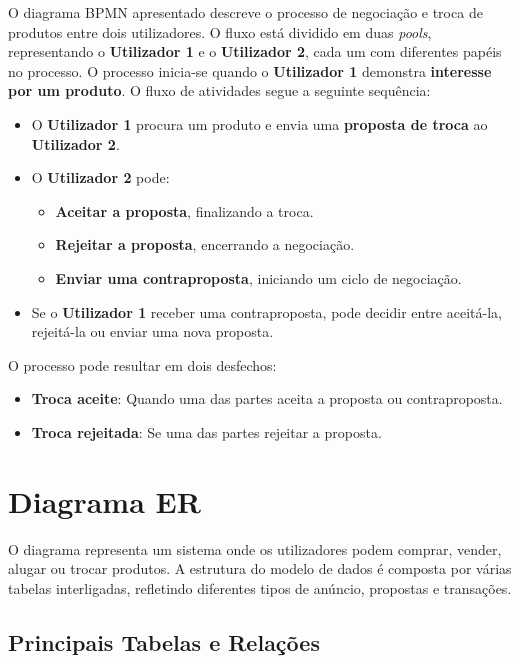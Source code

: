 \documentclass[a4paper, 12pt]{article} %
\begin{document}
O diagrama BPMN apresentado descreve o processo de negociação e troca de produtos entre dois utilizadores. O fluxo está dividido em duas \textit{pools}, representando o \textbf{Utilizador 1} e o \textbf{Utilizador 2}, cada um com diferentes papéis no processo. O processo inicia-se quando o \textbf{Utilizador 1} demonstra \textbf{interesse por um produto}. O fluxo de atividades segue a seguinte sequência:

\begin{itemize}
	\item O \textbf{Utilizador 1} procura um produto e envia uma \textbf{proposta de troca} ao \textbf{Utilizador 2}.
	\item O \textbf{Utilizador 2} pode:
	\begin{itemize}
		\item \textbf{Aceitar a proposta}, finalizando a troca.
		\item \textbf{Rejeitar a proposta}, encerrando a negociação.
		\item \textbf{Enviar uma contraproposta}, iniciando um ciclo de negociação.
	\end{itemize}
	\item Se o \textbf{Utilizador 1} receber uma contraproposta, pode decidir entre aceitá-la, rejeitá-la ou enviar uma nova proposta.
\end{itemize}

O processo pode resultar em dois desfechos:
\begin{itemize}
	\item \textbf{Troca aceite}: Quando uma das partes aceita a proposta ou contraproposta.
	\item \textbf{Troca rejeitada}: Se uma das partes rejeitar a proposta.
\end{itemize}
\newpage
\section{Diagrama ER}

O diagrama representa um sistema onde os utilizadores podem comprar, vender, alugar ou trocar produtos. A estrutura do modelo de dados é composta por várias tabelas interligadas, refletindo diferentes tipos de anúncio, propostas e transações.




\subsection{\textbf{Principais Tabelas e Relações}}
\end{document}
